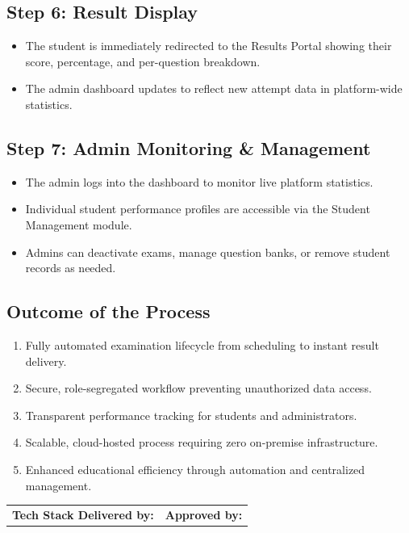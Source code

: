 \documentclass[12pt,a4paper]{article}
\begin{document}
\subsection*{Step 6: Result Display}
\begin{itemize}[leftmargin=1.5em]
  \item[(a)] The student is immediately redirected to the Results Portal showing their score, percentage, and per-question breakdown.
  \item[(b)] The admin dashboard updates to reflect new attempt data in platform-wide statistics.
\end{itemize}

\subsection*{Step 7: Admin Monitoring \& Management}
\begin{itemize}[leftmargin=1.5em]
  \item[(a)] The admin logs into the dashboard to monitor live platform statistics.
  \item[(b)] Individual student performance profiles are accessible via the Student Management module.
  \item[(c)] Admins can deactivate exams, manage question banks, or remove student records as needed.
\end{itemize}

\subsection{Outcome of the Process}

\begin{enumerate}[leftmargin=1.5em]
  \item Fully automated examination lifecycle from scheduling to instant result delivery.
  \item Secure, role-segregated workflow preventing unauthorized data access.
  \item Transparent performance tracking for students and administrators.
  \item Scalable, cloud-hosted process requiring zero on-premise infrastructure.
  \item Enhanced educational efficiency through automation and centralized management.
\end{enumerate}

\vspace{1.5cm}
\noindent\begin{tabular}{p{7cm} p{7cm}}
  \textbf{Tech Stack Delivered by:} \hrulefill & \textbf{Approved by:} \hrulefill \\
\end{tabular}
\end{document}
